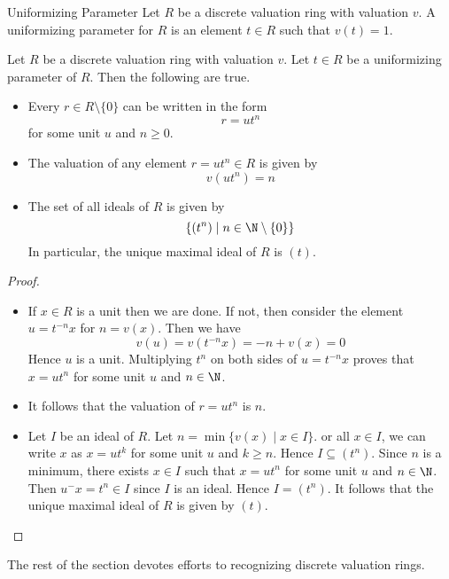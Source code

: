 \documentclass[a4paper]{article}
\begin{document}
\begin{defn}{Uniformizing Parameter}{} Let $R$ be a discrete valuation ring with valuation $v$. A uniformizing parameter for $R$ is an element $t\in R$ such that $v(t)=1$. 
\end{defn}

\begin{prp}{}{} Let $R$ be a discrete valuation ring with valuation $v$. Let $t\in R$ be a uniformizing parameter of $R$. Then the following are true. 
\begin{itemize}
\item Every $r\in R\setminus\{0\}$ can be written in the form $$r=ut^n$$ for some unit $u$ and $n\geq 0$. 
\item The valuation of any element $r=ut^n\in R$ is given by $$v(ut^n)=n$$
\item The set of all ideals of $R$ is given by $$\{(t^n)\;|\;n\in\N\setminus\{0\}\}$$ In particular, the unique maximal ideal of $R$ is $(t)$. 
\end{itemize} \tcbline
\begin{proof}~\\
\begin{itemize}
\item If $x\in R$ is a unit then we are done. If not, then consider the element $u=t^{-n}x$ for $n=v(x)$. Then we have $$v(u)=v(t^{-n}x)=-n+v(x)=0$$ Hence $u$ is a unit. Multiplying $t^n$ on both sides of $u=t^{-n}x$ proves that $x=ut^n$ for some unit $u$ and $n\in\N$. 
\item It follows that the valuation of $r=ut^n$ is $n$. 
\item Let $I$ be an ideal of $R$. Let $n=\min\{v(x)\;|\;x\in I\}$. or all $x\in I$, we can write $x$ as $x=ut^k$ for some unit $u$ and $k\geq n$. Hence $I\subseteq(t^n)$. Since $n$ is a minimum, there exists $x\in I$ such that $x=ut^n$ for some unit $u$ and $n\in\N$. Then $u^{-}x=t^n\in I$ since $I$ is an ideal. Hence $I=(t^n)$. It follows that the unique maximal ideal of $R$ is given by $(t)$. 
\end{itemize}
\end{proof}
\end{prp}

The rest of the section devotes efforts to recognizing discrete valuation rings. 
\end{document}
